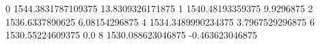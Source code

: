 0 1544.3831787109375 13.8309326171875
1 1540.48193359375 9.9296875
2 1536.6337890625 6.08154296875
4 1534.3489990234375 3.7967529296875
6 1530.55224609375 0.0
8 1530.088623046875 -0.463623046875
